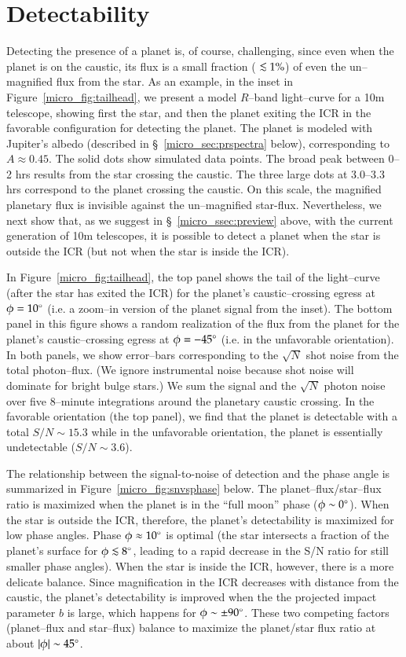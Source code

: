 \section{Detectability}
\label{micro_sec:detectability}
Detecting the presence of a planet is, of course, challenging, since
even when the planet is on the caustic, its flux is a small fraction
($\lsim 1\%$) of even the un--magnified flux from the star.  As an
example, in the inset in Figure~\ref{micro_fig:tailhead}, we present a model
$R$--band light--curve for a 10m telescope, showing first the star,
and then the planet exiting the ICR in the favorable configuration for
detecting the planet.  The planet is modeled with Jupiter's albedo
(described in \S~\ref{micro_sec:prspectra} below), corresponding to
$A\approx 0.45$. The solid dots show simulated data points.  The broad
peak between 0--2 hrs results from the star crossing the caustic.  The
three large dots at 3.0--3.3 hrs correspond to the planet crossing the
caustic.  On this scale, the magnified planetary flux is invisible
against the un--magnified star-flux.  Nevertheless, we next show that,
as we suggest in \S~\ref{micro_ssec:preview} above, with the current
generation of 10m telescopes, it is possible to detect a planet when
the star is outside the ICR (but not when the star is inside the ICR).

In Figure~\ref{micro_fig:tailhead}, the top panel shows the tail of the
light--curve (after the star has exited the ICR) for the planet's
caustic--crossing egress at $\phi=10\mbox{$^\circ$}$ (i.e. a zoom--in version of
the planet signal from the inset). The bottom panel in this figure
shows a random realization of the flux from the planet for the
planet's caustic--crossing egress at $\phi=-45\mbox{$^\circ$}$ (i.e. in the
unfavorable orientation).  In both panels, we show error--bars
corresponding to the $\sqrt{N}$ shot noise from the total
photon--flux.  (We ignore instrumental noise because shot noise will
dominate for bright bulge stars.)  We sum the signal and the
$\sqrt{N}$ photon noise over five 8--minute integrations around the
planetary caustic crossing. In the favorable orientation (the top
panel), we find that the planet is detectable with a total $S/N \sim
15.3$ while in the unfavorable orientation, the planet is essentially
undetectable ($S/N \sim 3.6$).

The relationship between the signal-to-noise of detection and the
phase angle is summarized in Figure~\ref{micro_fig:snvsphase} below.  The
planet--flux/star--flux ratio is maximized when the planet is in the
``full moon'' phase ($\phi \sim 0\mbox{$^\circ$}$).  When the star is outside
the ICR, therefore, the planet's detectability is maximized for low
phase angles.  Phase $\phi\approx 10\mbox{$^\circ$}$ is optimal (the star
intersects a fraction of the planet's surface for $\phi\lsim 8\degr$,
leading to a rapid decrease in the S/N ratio for still smaller phase
angles).  When the star is inside the ICR, however, there is a more
delicate balance.  Since magnification in the ICR decreases with
distance from the caustic, the planet's detectability is improved when
the the projected impact parameter $b$ is large, which happens for
$\phi \sim \pm 90\mbox{$^\circ$}$.  These two competing factors (planet--flux
and star--flux) balance to maximize the planet/star flux ratio at
about $|\phi|\sim45\mbox{$^\circ$}$.

